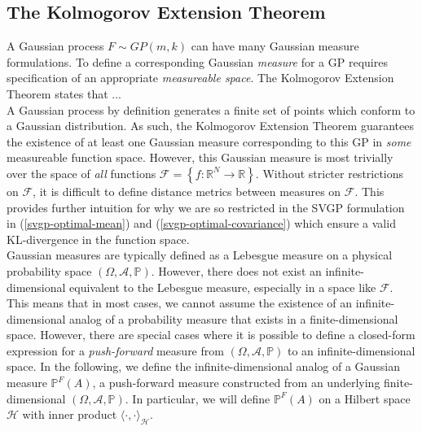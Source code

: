 \documentclass[twoside,11pt]{article}
\begin{document}
\subsection{The Kolmogorov Extension Theorem \cite{wild2022generalized}}
A Gaussian process $F \sim GP(m, k)$ can have many Gaussian measure formulations. To define a corresponding Gaussian \textit{measure} for a GP requires specification of an appropriate \textit{measureable space}. The Kolmogorov Extension Theorem states that ...
\newline
\\ A Gaussian process by definition generates a finite set of points which conform to a Gaussian distribution. As such, the Kolmogorov Extension Theorem guarantees the existence of at least one Gaussian measure corresponding to this GP in \textit{some} measureable function space. However, this Gaussian measure is most trivially over the space of \textit{all} functions $\mathcal{F} = \left\{f: \mathbb{R}^{N} \rightarrow \mathbb{R} \right\}$. Without stricter restrictions on $\mathcal{F}$, it is difficult to define distance metrics between measures on $\mathcal{F}$. This provides further intuition for why we are so restricted in the SVGP formulation in (\ref{svgp-optimal-mean}) and (\ref{svgp-optimal-covariance}) which ensure a valid KL-divergence in the function space.
\newline
\\Gaussian measures are typically defined as a Lebesgue measure on a physical probability space $(\Omega, \mathcal{A}, \mathbb{P})$. However, there does not exist an infinite-dimensional equivalent to the Lebesgue measure, especially in a space like $\mathcal{F}$. This means that in most cases, we cannot assume the existence of an infinite-dimensional analog of a probability measure that exists in a finite-dimensional space. However, there are special cases where it is possible to define a closed-form expression for a \textit{push-forward} measure from $(\Omega, \mathcal{A}, \mathbb{P})$ to an infinite-dimensional space. In the following, we define the infinite-dimensional analog of a Gaussian measure  $\mathbb{P}^{F}(A)$, a push-forward measure constructed from an underlying finite-dimensional $(\Omega, \mathcal{A}, \mathbb{P})$. In particular, we will define $\mathbb{P}^{F}(A)$ on a Hilbert space $\mathcal{H}$ with inner product $\langle \cdot, \cdot \rangle_\mathcal{H}$.
\end{document}
